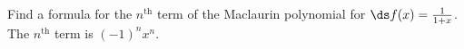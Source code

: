 {Find a formula for the $n^\text{th}$ term of the Maclaurin polynomial for $\ds f(x)=\frac{1}{1+x}$.
}
{The $n^\text{th}$ term is $(-1)^nx^n$.
}